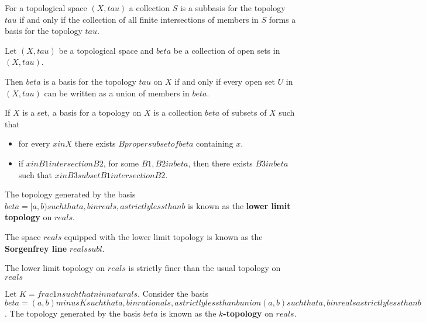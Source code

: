 \begin{note}
    For a topological space $(X, tau)$ a collection $S$ is a subbasis for the topology $tau$ if and only if the collection of all finite intersections of members in $S$ forms a basis for the topology $tau$.
\end{note}

\begin{thm}
    Let $(X, tau)$ be a topological space and $beta$ be a collection of open sets in $(X, tau)$.

    Then $beta$ is a basis for the topology $tau$ on $X$ if and only if every open set $U$ in $(X, tau)$ can be written as a union of members in $beta$.
\end{thm}

\begin{thm}
    If $X$ is a set, a basis for a topology on $X$ is a collection $beta$ of subsets of $X$ such that 
    \begin{itemize}
        \item for every $x in X$ there exists $B proper subset of beta$ containing $x$.
        \item if $x in B1 intersection B2$, for some $B1, B2 in beta$, then there exists $B3 in beta$ such that $x in B3 subset B1 intersection B2$.
    \end{itemize}
\end{thm}

\begin{defn}
    The topology generated by the basis $beta = {{ [a, b) such that a, b in reals, a strictly less than b }}$ is known as the \textbf{lower limit topology} on $reals$. 

    The space $reals$ equipped with the lower limit topology is known as the \textbf{Sorgenfrey line} $reals sub l$.
\end{defn}

\begin{prop}
    The lower limit topology on $reals$ is strictly finer than the usual topology on $reals$
\end{prop}

\begin{defn}
    Let $K = {{ frac{1}{n} such that n in naturals }}$. Consider the basis $beta = {{ (a, b) minus K such that a,b in rat    ionals, a strictly less than b }} union {{ (a,b) such that a,b in reals a strictly less than b }}$.  The topology generated by the basis $beta$ is known as the \textbf{$k$-topology} on $reals$.
\end{defn}

